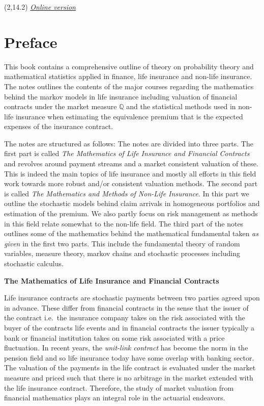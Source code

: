 \documentclass[a4paper,12pt,openany]{book}
\begin{document}
\begin{textblock}{12}(2,14.2)
\noindent\fontsize{16}{11}\selectfont \emph{\href{https://joakim-bilyk.github.io/books/theory}{Online version}}
\end{textblock}

\hspace{1pt}
\newpage

\chapter*{Preface}

This book contains a comprehensive outline of theory on probability theory and mathematical statistics applied in finance, life insurance and non-life insurance. The notes outlines the contents of the major courses regarding the mathematics behind the markov models in life insurance including valuation of financial contracts under the market measure \(\mathbb Q\) and the statistical methods used in non-life insurance when estimating the equivalence premium that is the expected expenses of the insurance contract.

The notes are structured as follows: The notes are divided into three parts. The first part is called \emph{The Mathematics of Life Insurance and Financial Contracts} and revolves around payment streams and a market consistent valuation of these. This is indeed the main topics of life insurance and mostly all efforts in this field work towards more robust and/or consistent valuation methods. The second part is called \emph{The Mathematics and Methods of Non-Life Insurance}. In this part we outline the stochastic models behind claim arrivals in homogeneous portfolios and estimation of the premium. We also partly focus on risk management as methods in this field relate somewhat to the non-life field. The third part of the notes outlines some of the mathematics behind the mathematical fundamental taken \emph{as given} in the first two parts. This include the fundamental theory of random variables, measure theory, markov chains and stochastic processes including stochastic calculus.

\textbf{The Mathematics of Life Insurance and Financial Contracts}

Life insurance contracts are stochastic payments between two parties agreed upon in advance. These differ from financial contracts in the sense that the issuer of the contract i.e.~the insurance company takes on the risk associated with the buyer of the contracts life events and in financial contracts the issuer typically a bank or financial institution takes on some risk associated with a price fluctuation. In recent years, the \emph{unit-link contract} has become the norm in the pension field and so life insurance today have some overlap with banking sector. The valuation of the payments in the life contract is evaluated under the market measure and priced such that there is no arbitrage in the market extended with the life insurance contract. Therefore, the study of market valuation from financial mathematics plays an integral role in the actuarial endeavors.
\end{document}
